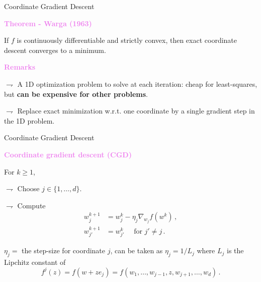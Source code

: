 \documentclass[9pt]{beamer}
\newcommand{\grad}{\nabla}
\begin{document}
\begin{frame}{Coordinate Gradient Descent}

\textbf{\textcolor{violet}{Theorem - Warga (1963)}}

If $f$ is \alert{continuously differentiable and strictly convex}, then exact coordinate descent \alert{converges to a minimum}.


\bigskip

\textbf{\textcolor{violet}{Remarks}}


$\rightharpoondown$ A 1D optimization problem to solve at each iteration: cheap for least-squares, but \textbf{can be expensive for other problems}.

$\rightharpoondown$ Replace exact minimization w.r.t. one coordinate by \alert{a single gradient step in the 1D problem}.

\end{frame}


\begin{frame}{Coordinate Gradient Descent}
			
\textbf{\textcolor{violet}{Coordinate gradient descent (CGD)}}

 For $k\geqslant 1$,

$\rightharpoondown$  Choose $j \in \{ 1, \ldots, d \}$.

$\rightharpoondown$  Compute
\begin{align*}
w_{j}^{k+1} &= w_{j}^{k} - \eta_{j} \grad_{w_j} f(w^k)\,, \\
w_{j'}^{k+1} &= w_{j'}^{k} \quad \text{ for } j' \neq j\,.
\end{align*}


\bigskip

\alert{$\eta_j=$ the step-size for coordinate $j$, can be taken as $\eta_j= 1 / L_j$} where $L_j$ is the Lipchitz constant of
\begin{equation*}
f^j(z) = f(w + z e_j) = f(w_1, \ldots, w_{j-1}, z, w_{j+1}, \ldots, w_d)\,.
\end{equation*}



\end{frame}
\end{document}
